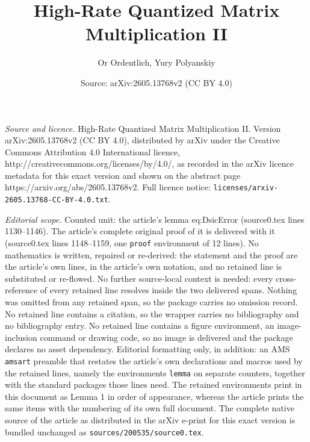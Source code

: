 \documentclass[10pt,a4paper]{amsart}
\title{High-Rate Quantized Matrix Multiplication II}
\author{Or Ordentlich, Yury Polyanskiy}
\date{Source: arXiv:2605.13768v2 (CC BY 4.0)}
\begin{document}
\maketitle

\noindent\emph{Source and licence.} High-Rate Quantized Matrix Multiplication II. Version arXiv:2605.13768v2 (CC BY 4.0), distributed by arXiv under the Creative Commons Attribution 4.0 International licence, http://creativecommons.org/licenses/by/4.0/, as recorded in the arXiv licence metadata for this exact version and shown on the abstract page https://arxiv.org/abs/2605.13768v2. Full licence notice: \texttt{licenses/arxiv-2605.13768-CC-BY-4.0.txt}.\par\smallskip

\noindent\textit{Editorial scope.} Counted unit: the article's lemma eq:DsicError (source0.tex lines 1130--1146). The article's complete original proof of it is delivered with it (source0.tex lines 1148--1159, one \texttt{proof} environment of 12 lines). No mathematics is written, repaired or re-derived: the statement and the proof are the article's own lines, in the article's own notation, and no retained line is substituted or re-flowed.  No further source-local context is needed: every cross-reference of every retained line resolves inside the two delivered spans.  Nothing was omitted from any retained span, so the package carries no omission record.  No retained line contains a citation, so the wrapper carries no bibliography and no bibliography entry.  No retained line contains a figure environment, an image-inclusion command or drawing code, so no image is delivered and the package declares no asset dependency.  Editorial formatting only, in addition: an AMS \texttt{amsart} preamble that restates the article's own declarations and macros used by the retained lines, namely the environments \texttt{lemma} on separate counters, together with the standard packages those lines need.  The retained environments print in this document as Lemma 1 in order of appearance, whereas the article prints the same items with the numbering of its own full document.  The complete native source of the article as distributed in the arXiv e-print for this exact version is bundled unchanged as \texttt{sources/200535/source0.tex}.
\end{document}
